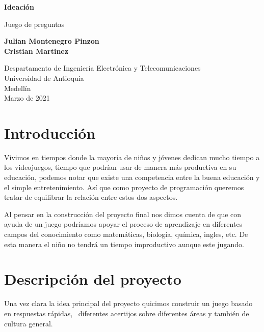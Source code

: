 \documentclass{article}
\begin{document}
\begin{titlepage}
    \begin{center}
        \vspace*{1cm}
            
        \Huge
        \textbf{Ideación}
            
        \vspace{0.5cm}
        \LARGE
        Juego de preguntas
            
        \vspace{1.5cm}
            
        \textbf{Julian Montenegro Pinzon}\\
        
        
        \textbf{Cristian Martinez}
        
            
        \vfill
            
        \vspace{0.8cm}
            
        \Large
        Despartamento de Ingeniería Electrónica y Telecomunicaciones\\
        Universidad de Antioquia\\
        Medellín\\
        Marzo de 2021
            
    \end{center}
\end{titlepage}

\tableofcontents
\newpage
\section{Introducción}\label{intro}
Vivimos en tiempos donde la mayoría de niños y jóvenes dedican mucho tiempo a los videojuegos, tiempo que podrían usar de manera más productiva en su educación, podemos notar que existe una competencia entre la buena educación y el simple entretenimiento. Así que como proyecto de programación queremos tratar de equilibrar la relación entre estos dos aspectos.

Al pensar en la construcción del proyecto final nos dimos cuenta de que con ayuda de un juego podríamos apoyar el proceso de aprendizaje en diferentes campos del conocimiento como matemáticas, biología, química, ingles, etc. De esta manera el niño no tendrá un tiempo improductivo aunque este jugando.

\section{Descripción del proyecto} \label{contenido}
Una vez clara la idea principal del proyecto quicimos construir un juego basado en respuestas rápidas,  diferentes acertijos sobre diferentes áreas y también de cultura general.
\end{document}
